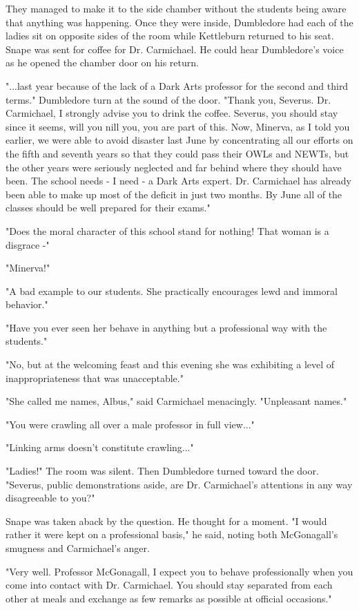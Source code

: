 They managed to make it to the side chamber without the students being aware that anything was happening. Once they were inside, Dumbledore had each of the ladies sit on opposite sides of the room while Kettleburn returned to his seat. Snape was sent for coffee for Dr. Carmichael. He could hear Dumbledore's voice as he opened the chamber door on his return.

"...last year because of the lack of a Dark Arts professor for the second and third terms." Dumbledore turn at the sound of the door. "Thank you, Severus. Dr. Carmichael, I strongly advise you to drink the coffee. Severus, you should stay since it seems, will you nill you, you are part of this. Now, Minerva, as I told you earlier, we were able to avoid disaster last June by concentrating all our efforts on the fifth and seventh years so that they could pass their OWLs and NEWTs, but the other years were seriously neglected and far behind where they should have been. The school needs - I need - a Dark Arts expert. Dr. Carmichael has already been able to make up most of the deficit in just two months. By June all of the classes should be well prepared for their exams."

"Does the moral character of this school stand for nothing! That woman is a disgrace -"

"Minerva!"

"A bad example to our students. She practically encourages lewd and immoral behavior."

"Have you ever seen her behave in anything but a professional way with the students."

"No, but at the welcoming feast and this evening she was exhibiting a level of inappropriateness that was unacceptable."

"She called me names, Albus," said Carmichael menacingly. "Unpleasant names."

"You were crawling all over a male professor in full view..."

"Linking arms doesn't constitute crawling..."

"Ladies!" The room was silent. Then Dumbledore turned toward the door. "Severus, public demonstrations aside, are Dr. Carmichael's attentions in any way disagreeable to you?"

Snape was taken aback by the question. He thought for a moment. "I would rather it were kept on a professional basis," he said, noting both McGonagall's smugness and Carmichael's anger.

"Very well. Professor McGonagall, I expect you to behave professionally when you come into contact with Dr. Carmichael. You should stay separated from each other at meals and exchange as few remarks as possible at official occasions."

